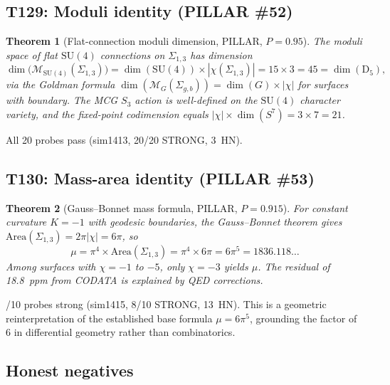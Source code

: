 \documentclass[aps,prd,twocolumn,superscriptaddress,floatfix,nofootinbib]{revtex4-2}
\newtheorem{theorem}{Theorem}
\theoremstyle{definition}
\theoremstyle{remark}
\begin{document}
\subsection{T129: Moduli identity (PILLAR \#52)}
\label{sec:t129-moduli}

\begin{theorem}[Flat-connection moduli dimension, PILLAR, $P{=}0.95$]
\label{thm:t129}
The moduli space of flat $\mathrm{SU}(4)$ connections on $\Sigma_{1,3}$ has dimension
\begin{equation}
\dim\bigl(\mathcal{M}_{\mathrm{SU}(4)}(\Sigma_{1,3})\bigr) = \dim(\mathrm{SU}(4)) \times |\chi(\Sigma_{1,3})| = 15 \times 3 = 45 = \dim(\mathrm{D}_5),
\end{equation}
via the Goldman formula $\dim(\mathcal{M}_G(\Sigma_{g,b})) = \dim(G) \times |\chi|$ for surfaces with boundary.
The MCG $S_3$ action is well-defined on the $\mathrm{SU}(4)$ character variety, and the fixed-point codimension equals $|\chi| \times \dim(S^7) = 3 \times 7 = 21$.
\end{theorem}

\noindent
All 20 probes pass (sim1413, 20/20 STRONG, 3~HN).

\subsection{T130: Mass-area identity (PILLAR \#53)}
\label{sec:t130-mass-area}

\begin{theorem}[Gauss--Bonnet mass formula, PILLAR, $P{=}0.915$]
\label{thm:t130}
For constant curvature $K = -1$ with geodesic boundaries, the Gauss--Bonnet theorem gives $\mathrm{Area}(\Sigma_{1,3}) = 2\pi|\chi| = 6\pi$, so
\begin{equation}
\mu = \pi^4 \times \mathrm{Area}(\Sigma_{1,3}) = \pi^4 \times 6\pi = 6\pi^5 = 1836.118\ldots
\end{equation}
Among surfaces with $\chi = -1$ to $-5$, only $\chi = -3$ yields $\mu$.  The residual of 18.8~ppm from CODATA is explained by QED corrections.
\end{theorem}

/10 probes strong (sim1415, 8/10 STRONG, 13~HN).  This is a geometric reinterpretation of the established base formula $\mu = 6\pi^5$, grounding the factor of~$6$ in differential geometry rather than combinatorics.

\subsection{Honest negatives}
\label{sec:blocks180-hn}
\end{document}
